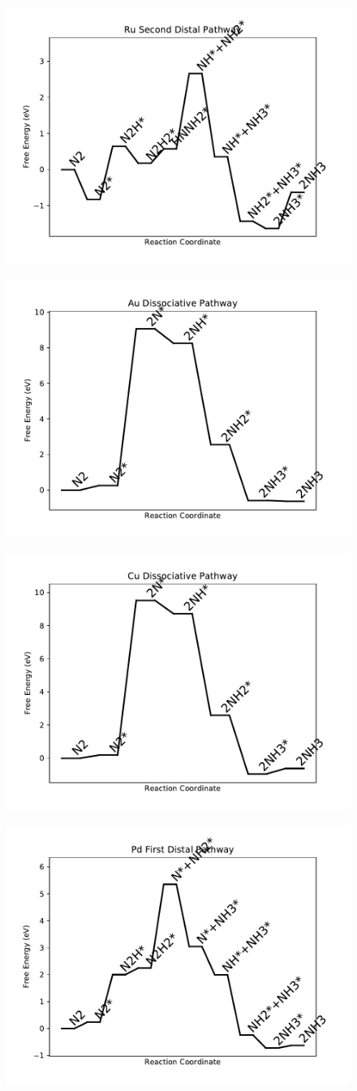 \documentclass[journal=jacsat,manuscript=article]{achemso}
\begin{document}
\begin{figure}
\includegraphics[width=0.5\linewidth]{data/plots/Ru_distal_2.pdf}
\label{fig:Ru_distal_2}
\end{figure}

\begin{figure}
\includegraphics[width=0.5\linewidth]{data/plots/Au_dissociative.pdf}
\label{fig:Au_dissociative}
\end{figure}

\begin{figure}
\includegraphics[width=0.5\linewidth]{data/plots/Cu_dissociative.pdf}
\label{fig:Cu_dissociative}
\end{figure}

\begin{figure}
\includegraphics[width=0.5\linewidth]{data/plots/Pd_distal_1.pdf}
\label{fig:Pd_distal_1}
\end{figure}
\end{document}
